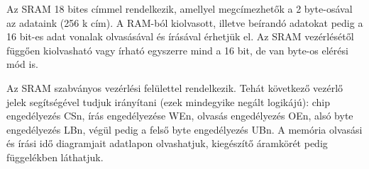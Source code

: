 	Az SRAM 18 bites címmel rendelkezik, amellyel megcímezhetők a 2 byte-osával az adataink (256 k cím). A RAM-ból kiolvasott, illetve beírandó adatokat pedig a 16 bit-es adat vonalak olvasásával és írásával érhetjük el. Az SRAM vezérlésétől függően kiolvasható vagy írható egyszerre mind a 16 bit, de van byte-os elérési mód is.
	
	Az SRAM szabványos vezérlési felülettel rendelkezik. Tehát következő vezérlő jelek segítségével tudjuk irányítani (ezek mindegyike negált logikájú): chip engedélyezés CSn, írás engedélyezése WEn, olvasás engedélyezés OEn, alsó byte engedélyezés LBn, végül pedig a felső byte engedélyezés UBn. A memória olvasási és írási idő diagramjait  adatlapon olvashatjuk, kiegészítő áramkörét pedig  függelékben láthatjuk.     
	
